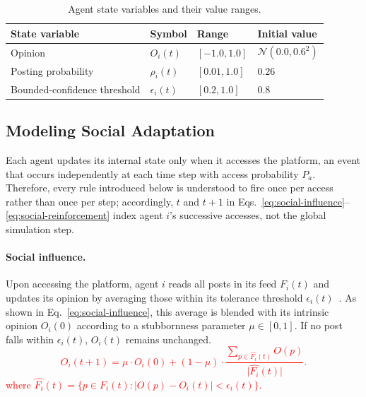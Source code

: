 \documentclass{svproc}
\def\red#1{\textcolor{red}{#1}}
\def\Blue{\color[rgb]{0,0,1}}
\def\Black{\color[rgb]{0,0,0}}
\def\post{\rho}                 %
\def\BoundedConfidence{\epsilon} %
\def\feed{F}                    %
\def\Stubbornness{\mu}           %
\begin{document}
\begin{table}[t]\Blue
\centering
\caption{Agent state variables and their value
  ranges.}\label{tab:state}
\tabcolsep=5pt
\begin{tabular}{llll}
\toprule
State variable & Symbol & Range & Initial value \\
\midrule
Opinion & $O_i(t)$ & $[ -1.0, 1.0]$ & $\mathcal{N}(0.0, 0.6^2)$ \\
Posting probability & $\post_i(t)$ & $[0.01, 1.0]$ & $0.26$ \\
Bounded-confidence threshold & $\BoundedConfidence_i(t)$ & $[0.2, 1.0]$ & $0.8$ \\
\bottomrule
\end{tabular}\Black
\end{table}



\subsection{Modeling Social Adaptation}\label{sec:model-adaptation}
Each agent updates its internal state only when it accesses the
platform, an event that occurs independently at each time step with
access probability $P_a$. Therefore, every rule introduced below is
understood to fire once per access rather than once per step;
accordingly, $t$ and $t{+}1$ in
Eqs.~\eqref{eq:social-influence}--\eqref{eq:social-reinforcement} index
agent $i$'s successive accesses, not the global simulation step.
\par


\paragraph{Social influence.}
Upon accessing the platform, agent $i$ reads all posts in its feed
$\feed_i(t)$ and updates its opinion by averaging those within its
tolerance threshold $\BoundedConfidence_i(t)$~\cite{friedkin1990}. As
shown in Eq.~\eqref{eq:social-influence}, this average is blended with
its intrinsic opinion $O_i(0)$ according to a stubbornness parameter
$\Stubbornness\in[0,1]$. If no post falls within
$\BoundedConfidence_i(t)$, $O_i(t)$ remains unchanged.
%
\red{
\begin{equation}
  O_i(t{+}1) = \Stubbornness\cdot O_i(0)
  + (1-\Stubbornness)\cdot
  \frac{\sum_{p\in \hat{\feed_i}(t)} O(p)}%
       {\big|\widehat{\feed_i}(t)\big|}.
  \label{eq:social-influence}
\end{equation}
where $\widehat{\feed_i}(t)=\{p\in \feed_i(t) : |O(p)-O_i(t)|<\BoundedConfidence_i(t)\}$.}
%
\end{document}
